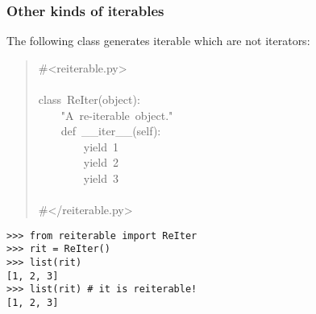 \documentclass[10pt,a4paper,english]{article}
\begin{document}
\hypertarget{other-kinds-of-iterables}{}
\subsubsection*{Other kinds of iterables}

The following class generates iterable which are not iterators:
\begin{quote}{\ttfamily \raggedright \noindent
{\#}<reiterable.py>~\\
~\\
class~ReIter(object):~\\
~~~~"A~re-iterable~object."~\\
~~~~def~{\_}{\_}iter{\_}{\_}(self):~\\
~~~~~~~~yield~1~\\
~~~~~~~~yield~2~\\
~~~~~~~~yield~3~\\
~\\
{\#}</reiterable.py>
}\end{quote}
\begin{verbatim}>>> from reiterable import ReIter
>>> rit = ReIter()
>>> list(rit)
[1, 2, 3]
>>> list(rit) # it is reiterable!
[1, 2, 3]\end{verbatim}



\hypertarget{the-itertools-module}{}
\end{document}
